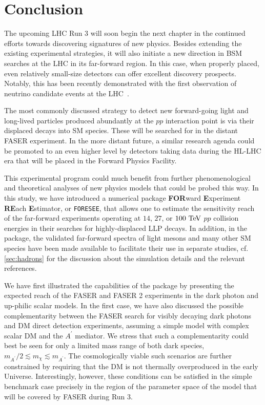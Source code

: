 \documentclass[prd,twocolumn,reprint,preprintnumbers,nofootinbib]{revtex4-1}
\begin{document}
\section{Conclusion}
\label{sec:conclusion} 

The upcoming LHC Run 3 will soon begin the next chapter in the continued efforts towards discovering signatures of new physics. Besides extending the existing experimental strategies, it will also initiate a new direction in BSM searches at the LHC in its far-forward region. In this case, when properly placed, even relatively small-size detectors can offer excellent discovery prospects. Notably, this has been recently demonstrated with the first observation of neutrino candidate events at the LHC~\cite{Abreu:2021hol}.

The most commonly discussed strategy to detect new forward-going light and long-lived particles produced abundantly at the $pp$ interaction point is via their displaced decays into SM species. These will be searched for in the distant FASER experiment. In the more distant future, a similar research agenda could be promoted to an even higher level by detectors taking data during the HL-LHC era that will be placed in the Forward Physics Facility.

This experimental program could much benefit from further phenomenological and theoretical analyses of new physics models that could be probed this way. In this study, we have introduced a numerical package \textbf{FOR}ward \textbf{E}xperiment \textbf{RE}ach \textbf{E}stimator, or \texttt{FORESEE}, that allows one to estimate the sensitivity reach of the far-forward experiments operating at $14$, $27$, or $100~\text{TeV}$ $pp$ collision energies in their searches for highly-displaced LLP decays. In addition, in the package, the validated far-forward spectra of light mesons and many other SM species have been made available to facilitate their use in separate studies, cf. \cref{sec:hadrons} for the discussion about the simulation details and the relevant references.

We have first illustrated the capabilities of the package by presenting the expected reach of the FASER and FASER 2 experiments in the dark photon and up-philic scalar models. In the first case, we have also discussed the possible complementarity between the FASER search for visibly decaying dark photons and DM direct detection experiments, assuming a simple model with complex scalar DM and the $A^\prime$ mediator. We stress that such a complementarity could best be seen for only a limited mass range of both dark species, $m_{A^\prime}/2 \lesssim m_\chi\lesssim m_{A^\prime}$. The cosmologically viable such scenarios are further constrained by requiring that the DM is not thermally overproduced in the early Universe. Interestingly, however, these conditions can be satisfied in the simple benchmark case precisely in the region of the parameter space of the model that will be covered by FASER during Run 3.
\end{document}
